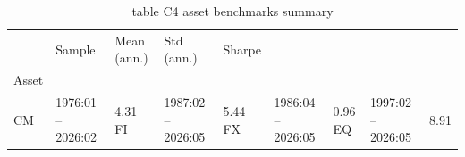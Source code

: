\begin{table}[htbp]
  \centering
  \caption{table C4 asset benchmarks summary}
  \label{tab:table_C4_asset_benchmarks_summary}
  \begin{tabular}{lllll}
\toprule
 & Sample & Mean (ann.) & Std (ann.) & Sharpe \\
Asset &  &  &  &  \\
\midrule
CM & 1976:01 – 2026:02 & 4.31%
FI & 1987:02 – 2026:05 & 5.44%
FX & 1986:04 – 2026:05 & 0.96%
EQ & 1997:02 – 2026:05 & 8.91%
\bottomrule
\end{tabular}

\end{table}

